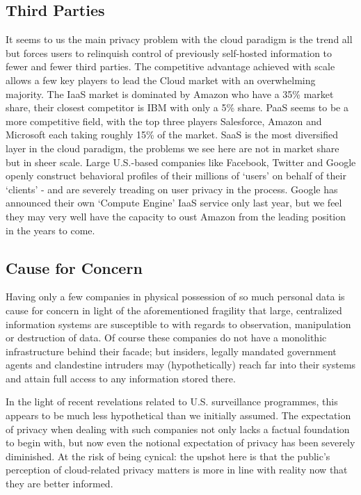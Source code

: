 \documentclass[11pt, a4paper]{article}
\begin{document}
\subsection{Third Parties}
It seems to us the main privacy problem with the cloud paradigm is the trend all but forces users to relinquish control of previously self-hosted information to fewer and fewer third parties.
The competitive advantage achieved with scale allows a few key players to lead the Cloud market with an overwhelming majority.
The IaaS market is dominated by Amazon who have a 35\% market share, their closest competitor is IBM with only a 5\% share.
PaaS seems to be a more competitive field, with the top three players Salesforce, Amazon and Microsoft each taking roughly 15\% of the market. \cite{cloud_market}
SaaS is the most diversified layer in the cloud paradigm, the problems we see here are not in market share but in sheer scale.
Large U.S.-based companies like Facebook, Twitter and Google openly construct behavioral profiles of their millions of `users' on behalf of their `clients' - and are severely treading on user privacy in the process.
Google has announced their own `Compute Engine' IaaS service only last year, but we feel they may very well have the capacity to oust Amazon from the leading position in the years to come.

\subsection{Cause for Concern}
Having only a few companies in physical possession of so much personal data is cause for concern in light of the aforementioned fragility that large, centralized information systems are susceptible to with regards to observation, manipulation or destruction of data.
Of course these companies do not have a monolithic infrastructure behind their facade; but insiders, legally mandated government agents and clandestine intruders may (hypothetically) reach far into their systems and attain full access to any information stored there.

In the light of recent revelations related to U.S. surveillance programmes, this appears to be much less hypothetical than we initially assumed.
The expectation of privacy when dealing with such companies not only lacks a factual foundation to begin with, but now even the notional expectation of privacy has been severely diminished.
At the risk of being cynical: the upshot here is that the public's perception of cloud-related privacy matters is more in line with reality now that they are better informed.
\end{document}
